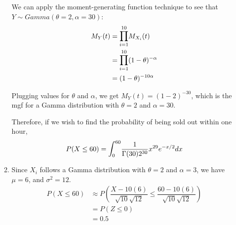 \documentclass{article}
\newcommand\lint{\mathlarger{\int}}
\newcommand\lprod{\mathlarger{\prod}}
\begin{document}
\begin{enumerate}
\begin{enumerate}
	We can apply the moment-generating function technique to see that 
	$Y \sim Gamma(\theta=2, \alpha=30)$:
	\begin{align*}
	M_Y(t) &= \lprod_{i=1}^{10}M_{X_i}(t) \\
	  &= \lprod_{i=1}^{10}{(1-\theta)^{-\alpha}} \\
	  &= (1-\theta)^{-10\alpha}
	\end{align*}
	
	Plugging values for $\theta$ and $\alpha$, we get $M_Y(t) = (1-2)^{-30}$, which is the mgf 
	for a Gamma distribution with $\theta=2$ and $\alpha=30$. 
	
	Therefore, if we wish to find the probability of being sold out within one hour,
	$$P(X \le 60) = \lint_0^{60} {\dfrac{1}{\Gamma(30)2^{30}}x^{29}e^{-x/2} dx}$$
       
       \item
	Since $X_i$ follows a Gamma distribution with $\theta=2$ and $\alpha = 3$, we have $\mu = 6$,
	and $\sigma^2 = 12$.
	\begin{align*}
	 P(X \le 60) &\approx P\left(\dfrac{X - 10(6)}{\sqrt{10}\sqrt{12}}
			      \le \dfrac{60 - 10(6)}{\sqrt{10}\sqrt{12}}\right) \\
	    &= P(Z \le 0) \\
	    &= 0.5
	\end{align*}
      \end{enumerate}      
    \end{enumerate}
    
\end{document}
